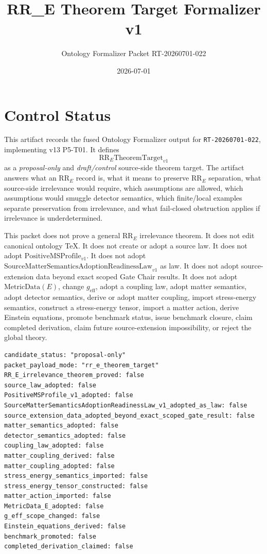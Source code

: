 \documentclass[11pt]{article}
\title{RR\_E Theorem Target Formalizer v1}
\author{Ontology Formalizer Packet RT-20260701-022}
\date{2026-07-01}
\newcommand{\SMSAR}{\mathrm{SourceMatterSemanticsAdoptionReadinessLaw}_{v1}}
\newcommand{\PMSProf}{\mathrm{PositiveMSProfile}_{v1}}
\newcommand{\RRE}{\mathrm{RR}_E}
\newcommand{\RRTarget}{\mathrm{RR}_{E}\mathrm{TheoremTarget}_{v1}}
\newcommand{\MetricData}{\mathrm{MetricData}}
\newcommand{\geff}{g_{\mathrm{eff}}}
\begin{document}
\maketitle

\section{Control Status}

This artifact records the fused Ontology Formalizer output for
\texttt{RT-20260701-022}, implementing v13 P5-T01. It defines
\[
  \RRTarget
\]
as a \emph{proposal-only} and \emph{draft/control} source-side theorem target.
The artifact answers what an \(\RRE\) record is, what it means to preserve
\(\RRE\) separation, what source-side irrelevance would require, which
assumptions are allowed, which assumptions would smuggle detector semantics,
which finite/local examples separate preservation from irrelevance, and what
fail-closed obstruction applies if irrelevance is underdetermined.

This packet does not prove a general \(\RRE\) irrelevance theorem. It does not
edit canonical ontology TeX. It does not create or adopt a source law. It does
not adopt \(\PMSProf\). It does not adopt \(\SMSAR\) as law. It does not adopt
source-extension data beyond exact scoped Gate Chair results. It does not
adopt \(\MetricData(E)\), change \(\geff\), adopt a coupling law, adopt matter
semantics, adopt detector semantics, derive or adopt matter coupling, import
stress-energy semantics, construct a stress-energy tensor, import a matter
action, derive Einstein equations, promote benchmark status, issue benchmark
closure, claim completed derivation, claim future source-extension
impossibility, or reject the global theory.

\begin{verbatim}
candidate_status: "proposal-only"
packet_payload_mode: "rr_e_theorem_target"
RR_E_irrelevance_theorem_proved: false
source_law_adopted: false
PositiveMSProfile_v1_adopted: false
SourceMatterSemanticsAdoptionReadinessLaw_v1_adopted_as_law: false
source_extension_data_adopted_beyond_exact_scoped_gate_result: false
matter_semantics_adopted: false
detector_semantics_adopted: false
coupling_law_adopted: false
matter_coupling_derived: false
matter_coupling_adopted: false
stress_energy_semantics_imported: false
stress_energy_tensor_constructed: false
matter_action_imported: false
MetricData_E_adopted: false
g_eff_scope_changed: false
Einstein_equations_derived: false
benchmark_promoted: false
completed_derivation_claimed: false
\end{verbatim}
\end{document}
